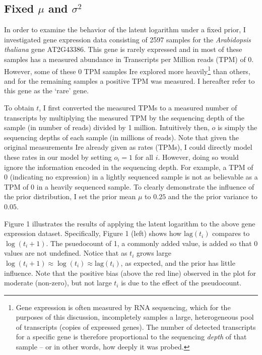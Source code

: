 \documentclass[11pt]{article}
\begin{document}
\subsection{Fixed $\mu$ and $\sigma^2$}
In order to examine the behavior of the latent logarithm under a fixed prior, I investigated gene expression data consisting of 2597 samples for the \emph{Arabidopsis thaliana} gene AT2G43386. This gene is rarely expressed and in most of these samples has a measured abundance in Transcripts per Million reads (TPM) of 0. However, some of these 0 TPM samples Ire explored more heavily\footnote[3]{Gene expression is often measured by RNA sequencing, which for the purposes of this discussion, incompletely samples a large, heterogeneous pool of transcripts (copies of expressed genes). The number of detected transcripts for a specific gene is therefore proportional to the sequencing \emph{depth} of that sample -- or in other words, how deeply it was probed.} than others, and for the remaining samples a positive TPM was measured. I hereafter refer to this gene as the `rare' gene.

To obtain $t$, I first converted the measured TPMs to a measured number of transcripts by multiplying the measured TPM by the sequencing depth of the sample (in number of reads) divided by 1 million. Intuitively then, $o$ is simply the sequencing depths of each sample (in millions of reads). Note that given the original measurements Ire already given as rates (TPMs), I could directly model these rates in our model by setting $o_i = 1$ for all $i$. However, doing so would ignore the information encoded in the sequencing depth. For example, a TPM of 0 (indicating no expression) in a lightly sequenced sample is not as believable as a TPM of 0 in a heavily sequenced sample. To clearly demonstrate the influence of the prior distribution, I set the prior mean $\mu$ to $0.25$ and the the prior variance to $0.05$. 

Figure 1 illustrates the results of applying the latent logarithm to the above gene expression dataset. Specifically, Figure 1 (left) shows how $\textrm{lag}(t_i)$ compares to $\log(t_i + 1)$. The psuedocount of 1, a commonly added value, is added so that 0 values are not undefined. Notice that as $t_i$ grows large $\log(t_i + 1) \approx \log(t_i) \approx \textrm{lag}(t_i)$, as expected, and the prior has little influence. Note that the positive bias (above the red line) observed in the plot for moderate (non-zero), but not large $t_i$ is due to the effect of the pseudocount. 
\end{document}
